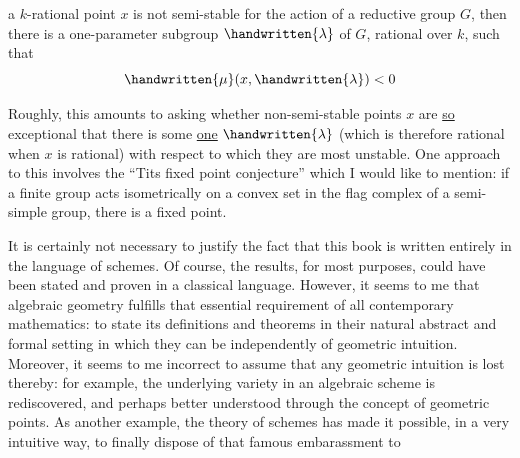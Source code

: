 
a $k$-rational point $x$ is not semi-stable for the action of a reductive group $G$, then there is a one-parameter subgroup $\handwritten{\lambda}$ of $G$, rational over $k$, such that
\[
\handwritten{\mu}(x,\handwritten{\lambda})<0
\]

Roughly, this amounts to asking whether non-semi-stable points $x$ are \uline{so} exceptional that there is some \uline{one} $\handwritten{\lambda}$ (which is therefore rational when $x$ is rational) with respect to which they are most unstable. One approach to this involves the ``Tits fixed point conjecture'' which I would like to mention: if a finite group acts isometrically on a convex set in the flag complex of a semi-simple group, there is a fixed point.

It is certainly not necessary to justify the fact that this book is written entirely in the language of schemes. Of course, the results, for most purposes, could have been stated and proven in a classical language. However, it seems to me  that algebraic geometry fulfills
that essential requirement of all contemporary mathematics: to state its definitions and theorems in their natural abstract and formal setting in which they can be  independently of geometric intuition. Moreover, it seems to me incorrect to assume that any geometric intuition is lost thereby: for example, the underlying variety in an algebraic scheme is rediscovered, and perhaps better understood through the concept of geometric points. As another example, the theory of schemes has made it possible, in a very intuitive way, to finally dispose of that famous embarassment to
